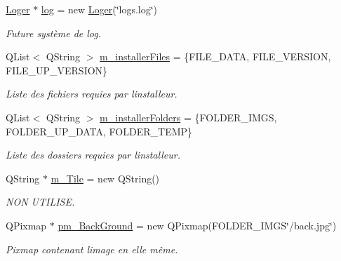 \begin{DoxyCompactItemize}
\hyperlink{classLoger}{Loger} $\ast$ \hyperlink{classmainWindow_aed7a3201ec1a3481d2f4d6446fd02569}{log} = new \hyperlink{classLoger}{Loger}(\char`\"{}logs.\+log\char`\"{})
\begin{DoxyCompactList}\small\item\em Future système de log. \end{DoxyCompactList}\item 
\mbox{\label{classmainWindow_a79abdebffdd2e316715d5d46a0cc644c}} 
Q\+List$<$ Q\+String $>$ \hyperlink{classmainWindow_a79abdebffdd2e316715d5d46a0cc644c}{m\+\_\+installer\+Files} = \{F\+I\+L\+E\+\_\+\+D\+A\+TA, F\+I\+L\+E\+\_\+\+V\+E\+R\+S\+I\+ON, F\+I\+L\+E\+\_\+\+U\+P\+\_\+\+V\+E\+R\+S\+I\+ON\}
\begin{DoxyCompactList}\small\item\em Liste des fichiers requies par l\textquotesingle{}installeur. \end{DoxyCompactList}\item 
\mbox{\label{classmainWindow_ab13618675bf965bf7f8dd57d48f74e4c}} 
Q\+List$<$ Q\+String $>$ \hyperlink{classmainWindow_ab13618675bf965bf7f8dd57d48f74e4c}{m\+\_\+installer\+Folders} = \{F\+O\+L\+D\+E\+R\+\_\+\+I\+M\+GS, F\+O\+L\+D\+E\+R\+\_\+\+U\+P\+\_\+\+D\+A\+TA, F\+O\+L\+D\+E\+R\+\_\+\+T\+E\+MP\}
\begin{DoxyCompactList}\small\item\em Liste des dossiers requies par l\textquotesingle{}installeur. \end{DoxyCompactList}\item 
\mbox{\label{classmainWindow_ac968818db675e22156b4521cb9b43781}} 
Q\+String $\ast$ \hyperlink{classmainWindow_ac968818db675e22156b4521cb9b43781}{m\+\_\+\+Tile} = new Q\+String()
\begin{DoxyCompactList}\small\item\em N\+ON U\+T\+I\+L\+I\+SE. \end{DoxyCompactList}\item 
\mbox{\label{classmainWindow_adee4e2756aae8a5fb3761102d5d12d35}} 
Q\+Pixmap $\ast$ \hyperlink{classmainWindow_adee4e2756aae8a5fb3761102d5d12d35}{pm\+\_\+\+Back\+Ground} = new Q\+Pixmap(F\+O\+L\+D\+E\+R\+\_\+\+I\+M\+GS\char`\"{}/back.\+jpg\char`\"{})
\begin{DoxyCompactList}\small\item\em Pixmap contenant l\textquotesingle{}image en elle même. \end{DoxyCompactList}\item 

\end{DoxyCompactItemize}
